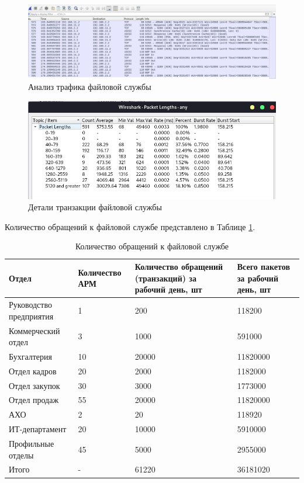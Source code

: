 \documentclass[14pt, a4paper]{extarticle}
\numberwithin{equation}{section}
\begin{document}
\begin{figure}[H]
        \centering
        \includegraphics[scale=0.5]{iscsi_wireshark.png}
        \caption{Анализ трафика файловой службы}
        \label{fig:wireshark_iscsi_dump}
\end{figure}
\begin{figure}[H]
        \centering
        \includegraphics[scale=0.7]{iscsi_stats_wireshark.png}
        \caption{Детали транзакции файловой службы}
        \label{fig:wireshark_iscsi_stats_dump}
\end{figure}

Количество обращений к файловой службе представлено в Таблице \ref{table:iscsi_requests}.
\begin{table}[H]
\centering
\small
\caption{Количество обращений к файловой службе}
\label{table:iscsi_requests}
\begin{tabular}{|m{3cm}|m{3cm}|m{4cm}|m{3cm}|}
\hline
\textbf{Отдел} & \textbf{Количество АРМ} & \textbf{Количество обращений (транзакций) за рабочий день, шт } & \textbf{Всего пакетов за рабочий день, шт }\\
\hline
Руководство предприятия & 1 & 200 & 118200\\
\hline
Коммерческий отдел & 3 & 1000 & 591000\\
\hline
Бухгалтерия & 10 & 20000 & 11820000 \\
\hline
Отдел кадров & 20 & 2000 &  1182000\\
\hline
Отдел закупок & 30 & 3000 & 1773000\\
\hline
Отдел продаж & 55 & 20000 & 11820000 \\
\hline
АХО & 2 & 20 & 118920\\
\hline
ИТ-департамент & 20 & 10000 & 5910000\\
\hline
Профильные отделы & 45 & 5000 & 2955000 \\
\hline
Итого & - & 61220 & 36181020\\
\hline
\end{tabular}
\end{table}
\end{document}
